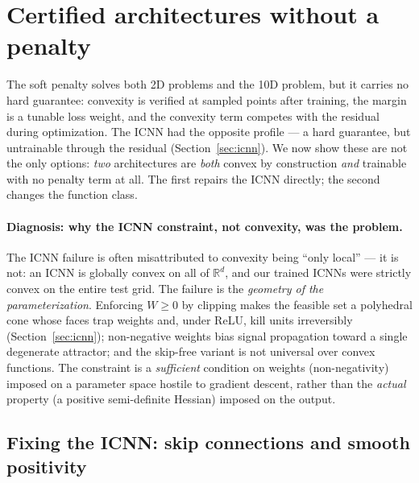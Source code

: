 \documentclass[11pt,a4paper]{article}
\newcommand{\R}{\mathbb{R}}
\begin{document}
\section{Certified architectures without a penalty}\label{sec:lseq}

The soft penalty solves both 2D problems and the 10D problem, but it carries
no hard guarantee: convexity is verified at sampled points after training,
the margin is a tunable loss weight, and the convexity term competes with the
residual during optimization. The ICNN had the opposite profile --- a hard
guarantee, but untrainable through the residual (Section~\ref{sec:icnn}). We
now show these are not the only options: \emph{two} architectures are
\emph{both} convex by construction \emph{and} trainable with no penalty term
at all. The first repairs the ICNN directly; the second changes the function
class.

\paragraph{Diagnosis: why the ICNN constraint, not convexity, was the
problem.} The ICNN failure is often misattributed to convexity being ``only
local'' --- it is not: an ICNN is globally convex on all of $\R^d$, and our
trained ICNNs were strictly convex on the entire test grid. The failure is
the \emph{geometry of the parameterization}. Enforcing $W \ge 0$ by clipping
makes the feasible set a polyhedral cone whose faces trap weights and, under
ReLU, kill units irreversibly (Section~\ref{sec:icnn}); non-negative weights
bias signal propagation toward a single degenerate attractor; and the
skip-free variant is not universal over convex functions. The constraint is a
\emph{sufficient} condition on weights (non-negativity) imposed on a
parameter space hostile to gradient descent, rather than the \emph{actual}
property (a positive semi-definite Hessian) imposed on the output.

\subsection{Fixing the ICNN: skip connections and smooth positivity}
\label{sec:ficnn}
\end{document}
